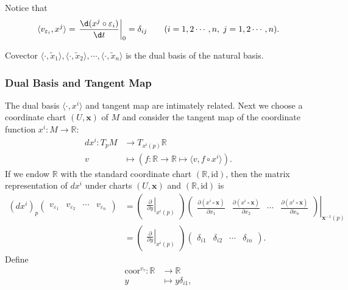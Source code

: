 \documentclass{report}
\begin{document}
Notice that
\[
    \langle v_{\varepsilon_i}, x^j\rangle=\left.\frac{\d( x^j\circ\varepsilon_i)}{\d t}\right|_0=\delta_{ij}\qquad(i=1,2\cdots,n,\;j=1,2\cdots,n).
\]

Covector $\langle\cdot,\tilde{x}_1\rangle,\langle\cdot,\tilde{x}_2\rangle,\cdots,\langle\cdot,\tilde{x}_n\rangle$ is the dual basis of the natural basis.

\subsubsection{Dual Basis and Tangent Map}
The dual basis $\langle\cdot,{x}^i\rangle$ and tangent map are intimately related. 
Next we choose a coordinate chart $(U,\mathbf{x})$ of $M$ and consider the tangent map of the coordinate function ${x}^i: M\to \mathbb{R}$:
\[
    \begin{aligned}
        d{x}^i:T_pM&\longrightarrow T_{{x}^i(p)}\mathbb{R}\\
        v&\longmapsto \left(f:\mathbb{R}\to \mathbb{R} \longmapsto\langle v,f\circ {x}^i\rangle\right).
    \end{aligned}
\]
If we endow $\mathbb{R}$ with the standard coordinate chart $(\mathbb{R},\mathrm{id})$, then the matrix representation of $d{x}^i$ under charts $(U,\mathbf{x})$ and $(\mathbb{R},\mathrm{id})$ is
\[
    \begin{aligned}
    (d{x}^i)_p
    \begin{pmatrix}
    v_{\varepsilon_1}&v_{\varepsilon_2}&\cdots&v_{\varepsilon_n}
    \end{pmatrix}
    &=
    \begin{pmatrix}
        \left.\frac{\partial}{\partial y}\right|_{{x}^i(p)}
    \end{pmatrix}
    \left.\begin{pmatrix}
        \frac{\partial({x}^i\circ\mathbf{x})}{\partial
x_1}&\frac{\partial({x}^i\circ\mathbf{x})}{\partial
x_2}&\cdots&\frac{\partial({x}^i\circ\mathbf{x})}{\partial x_n}
    \end{pmatrix}\right|_{\mathbf{x}^{-1}(p)}\\
    &=\begin{pmatrix}
        \left.\frac{\partial}{\partial y}\right|_{{x}^i(p)}
    \end{pmatrix}
    \begin{pmatrix}
        \delta_{i1} &\delta_{i2}&\cdots&\delta_{in}
    \end{pmatrix}.
    \end{aligned}
    \]
Define
\[
    \begin{aligned}
        \mathrm{coor}^{v_{\tau}}:\mathbb{R}&\longrightarrow\mathbb{R}\\
        y&\longmapsto y\delta_{i1},
    \end{aligned}
\]
\end{document}

